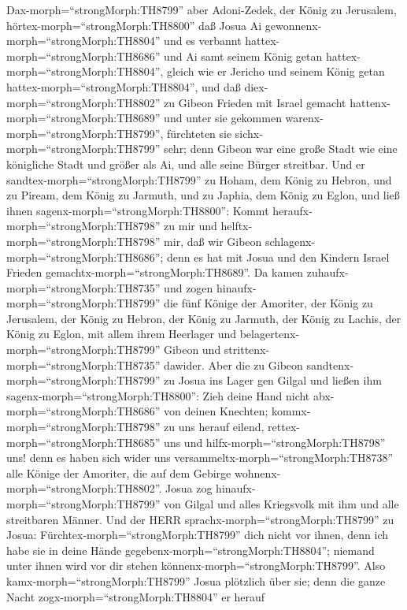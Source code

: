  Dax-morph=``strongMorph:TH8799'' aber Adoni-Zedek, der
König zu Jerusalem, hörtex-morph=``strongMorph:TH8800'' daß Josua Ai
gewonnenx-morph=``strongMorph:TH8804'' und es verbannt
hattex-morph=``strongMorph:TH8686'' und Ai samt seinem König getan
hattex-morph=``strongMorph:TH8804'', gleich wie er Jericho und seinem
König getan hattex-morph=``strongMorph:TH8804'', und daß
diex-morph=``strongMorph:TH8802'' zu Gibeon Frieden mit Israel gemacht
hattenx-morph=``strongMorph:TH8689'' und unter sie gekommen
warenx-morph=``strongMorph:TH8799'',  fürchteten sie
sichx-morph=``strongMorph:TH8799'' sehr; denn Gibeon war eine große
Stadt wie eine königliche Stadt und größer als Ai, und alle seine Bürger
streitbar.  Und er sandtex-morph=``strongMorph:TH8799'' zu
Hoham, dem König zu Hebron, und zu Piream, dem König zu Jarmuth, und zu
Japhia, dem König zu Eglon, und ließ ihnen
sagenx-morph=``strongMorph:TH8800'':  Kommt
heraufx-morph=``strongMorph:TH8798'' zu mir und
helftx-morph=``strongMorph:TH8798'' mir, daß wir Gibeon
schlagenx-morph=``strongMorph:TH8686''; denn es hat mit Josua und den
Kindern Israel Frieden gemachtx-morph=``strongMorph:TH8689''.
 Da kamen zuhaufx-morph=``strongMorph:TH8735'' und zogen
hinaufx-morph=``strongMorph:TH8799'' die fünf Könige der Amoriter, der
König zu Jerusalem, der König zu Hebron, der König zu Jarmuth, der König
zu Lachis, der König zu Eglon, mit allem ihrem Heerlager und
belagertenx-morph=``strongMorph:TH8799'' Gibeon und
strittenx-morph=``strongMorph:TH8735'' dawider.  Aber die zu
Gibeon sandtenx-morph=``strongMorph:TH8799'' zu Josua ins Lager gen
Gilgal und ließen ihm sagenx-morph=``strongMorph:TH8800'': Zieh deine
Hand nicht abx-morph=``strongMorph:TH8686'' von deinen Knechten;
kommx-morph=``strongMorph:TH8798'' zu uns herauf eilend,
rettex-morph=``strongMorph:TH8685'' uns und
hilfx-morph=``strongMorph:TH8798'' uns! denn es haben sich wider uns
versammeltx-morph=``strongMorph:TH8738'' alle Könige der Amoriter, die
auf dem Gebirge wohnenx-morph=``strongMorph:TH8802''.  Josua
zog hinaufx-morph=``strongMorph:TH8799'' von Gilgal und alles Kriegsvolk
mit ihm und alle streitbaren Männer.  Und der HERR
sprachx-morph=``strongMorph:TH8799'' zu Josua:
Fürchtex-morph=``strongMorph:TH8799'' dich nicht vor ihnen, denn ich
habe sie in deine Hände gegebenx-morph=``strongMorph:TH8804''; niemand
unter ihnen wird vor dir stehen könnenx-morph=``strongMorph:TH8799''.
 Also kamx-morph=``strongMorph:TH8799'' Josua plötzlich über
sie; denn die ganze Nacht zogx-morph=``strongMorph:TH8804'' er herauf
